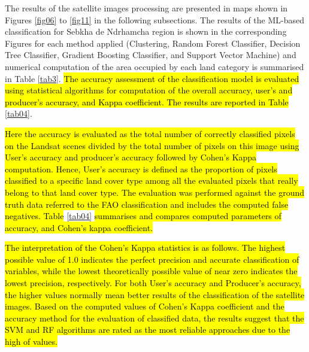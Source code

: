\documentclass[12pt,a4paper,oneside]{article}
\def \newpar{\vspace{6pt}}
\begin{document}
\newpar The results of the satellite images processing are presented in maps shown in Figures \ref{fig06} to \ref{fig11} in the following subsections. The results of the ML-based classification for Sebkha de Ndrhamcha region  is shown in the corresponding Figures for each method applied (Clustering, Random Forest Classifier, Decision Tree Classifier, Gradient Boosting Classifier, and Support Vector Machine) and numerical computation of the area occupied by each land category is summarised in Table \ref{tab3}. \hl{The accuracy assessment of the classification model is evaluated using statistical algorithms for computation of the overall accuracy, user's and producer's accuracy, and Kappa coefficient. The results are reported in Table} \ref{tab04}.

\newpar \hl{Here the accuracy is evaluated as the total number of correctly classified pixels on the Landsat scenes divided by the total number of pixels on this image using User's accuracy and producer's accuracy followed by Cohen's Kappa computation. Hence, User's accuracy is defined as the proportion of pixels classified to a specific land cover type among all the evaluated pixels that really belong to that land cover type. The evaluation was performed against the ground truth data referred to the FAO classification and includes the computed false negatives. Table} \ref{tab04} \hl{summarises and compares computed parameters of accuracy, and Cohen's kappa coefficient.}

\newpar \hl{The interpretation of the Cohen's Kappa statistics is as follows. The highest possible value of 1.0 indicates the perfect precision and accurate classification of variables, while the lowest theoretically possible value of near zero indicates the lowest precision, respectively. For both User's accuracy and Producer's accuracy, the higher values normally mean better results of the classification of the satellite images. Based on the computed values of Cohen's Kappa coefficient and the accuracy method for the evaluation of classified data, the results suggest that the SVM and RF algorithms are rated as the most reliable approaches due to the high of values.}
\end{document}
